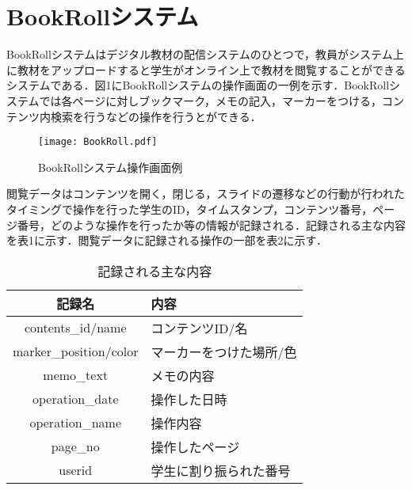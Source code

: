 \documentclass[a4j]{jarticle}
\begin{document}
\section{BookRollシステム}
BookRollシステムはデジタル教材の配信システムのひとつで，教員がシステム上に教材をアップロードすると学生がオンライン上で教材を閲覧することができるシステムである．図1にBookRollシステムの操作画面の一例を示す．BookRollシステムでは各ページに対しブックマーク，メモの記入，マーカーをつける，コンテンツ内検索を行うなどの操作を行うとができる．

\begin{figure}[h]
  \centering
  \texttt{[image: BookRoll.pdf]}
  \caption{BookRollシステム操作画面例}
  \label{fig:BookRollシステム操作画面例}
\end{figure}

閲覧データはコンテンツを開く，閉じる，スライドの遷移などの行動が行われたタイミングで操作を行った学生のID，タイムスタンプ，コンテンツ番号，ページ番号，どのような操作を行ったか等の情報が記録される．記録される主な内容を表1に示す．閲覧データに記録される操作の一部を表2に示す．

\begin{table}[h]
  \centering
  \begin{tabular}{c|l}
    記録名 & 内容 \\ \hline
    contents\_id/name & コンテンツID/名 \\ 
    marker\_position/color & マーカーをつけた場所/色 \\ 
    memo\_text & メモの内容 \\
    operation\_date & 操作した日時 \\ 
    operation\_name & 操作内容 \\ 
    page\_no & 操作したページ \\ 
    userid & 学生に割り振られた番号 \\ \hline
  \end{tabular}
  \caption{記録される主な内容}
  \label{tb:記録される主な内容}
\end{table}
\end{document}
